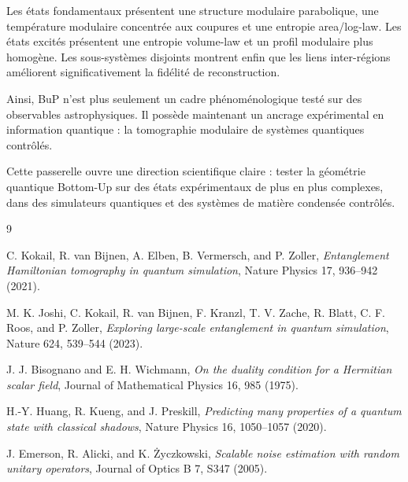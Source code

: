 \documentclass[11pt,a4paper]{article}
\begin{document}
Les états fondamentaux présentent une structure modulaire parabolique, une température modulaire concentrée aux coupures et une entropie area/log-law. Les états excités présentent une entropie volume-law et un profil modulaire plus homogène. Les sous-systèmes disjoints montrent enfin que les liens inter-régions améliorent significativement la fidélité de reconstruction.

Ainsi, BuP n'est plus seulement un cadre phénoménologique testé sur des observables astrophysiques. Il possède maintenant un ancrage expérimental en information quantique : la tomographie modulaire de systèmes quantiques contrôlés.

Cette passerelle ouvre une direction scientifique claire : tester la géométrie quantique Bottom-Up sur des états expérimentaux de plus en plus complexes, dans des simulateurs quantiques et des systèmes de matière condensée contrôlés.

\begin{thebibliography}{9}

C. Kokail, R. van Bijnen, A. Elben, B. Vermersch, and P. Zoller,
\emph{Entanglement Hamiltonian tomography in quantum simulation},
Nature Physics 17, 936--942 (2021).

M. K. Joshi, C. Kokail, R. van Bijnen, F. Kranzl, T. V. Zache,
R. Blatt, C. F. Roos, and P. Zoller,
\emph{Exploring large-scale entanglement in quantum simulation},
Nature 624, 539--544 (2023).

J. J. Bisognano and E. H. Wichmann,
\emph{On the duality condition for a Hermitian scalar field},
Journal of Mathematical Physics 16, 985 (1975).

H.-Y. Huang, R. Kueng, and J. Preskill,
\emph{Predicting many properties of a quantum state with classical shadows},
Nature Physics 16, 1050--1057 (2020).

J. Emerson, R. Alicki, and K. Życzkowski,
\emph{Scalable noise estimation with random unitary operators},
Journal of Optics B 7, S347 (2005).

\end{thebibliography}
\end{document}
